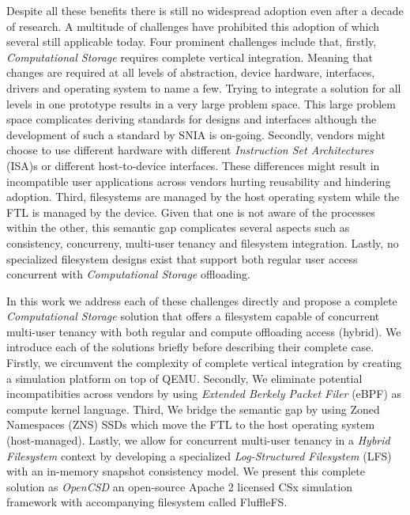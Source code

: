 \documentclass[conference]{IEEEtran}
\begin{document}

Despite all these benefits there is still no widespread adoption even after a
decade of research\cite{lukken2021past}. A multitude of challenges
have prohibited this adoption of which several still applicable today. Four
prominent challenges include that, firstly, \textit{Computational Storage}
requires complete vertical integration. Meaning that changes are required at all
levels of abstraction, device hardware, interfaces, drivers and operating system
to name a few. Trying to integrate a solution for all levels in one prototype
results in a very large problem space. This large problem space complicates
deriving standards for designs and interfaces although the development of such a
standard by SNIA is on-going\cite{snia-model}. Secondly, vendors might choose to
use different hardware with different
\textit{Instruction Set Architectures} (ISA)s or different host-to-device
interfaces. These differences might result in incompatible user applications
across vendors hurting reusability and hindering adoption. Third, filesystems
are managed by the host operating system while the FTL is
managed by the device. Given that one is not aware of the processes within the
other, this semantic gap complicates several aspects such as consistency,
concurreny, multi-user tenancy and filesystem integration. Lastly, no
specialized filesystem designs exist that support both regular user access
concurrent with \textit{Computational Storage} offloading.


In this work we address each of these challenges directly and propose a
complete \textit{Computational Storage} solution that offers a filesystem
capable of concurrent multi-user tenancy with both regular and compute
offloading access (hybrid). We introduce each of the solutions briefly before
describing their complete case. Firstly, we circumvent the complexity of
complete vertical integration by creating a simulation platform on top of
QEMU\cite{qemu}. Secondly, We eliminate potential incompatibities across vendors
by using \textit{Extended Berkely Packet Filer} (eBPF)\cite{what-ebpf} as
compute kernel language. Third, We bridge the semantic gap by using Zoned
Namespaces (ZNS)\cite{zns} SSDs which move the FTL to the host operating
system (host-managed). Lastly, we allow for concurrent multi-user tenancy in
a \textit{Hybrid Filesystem} context by developing a specialized
\textit{Log-Structured Filesystem} (LFS)\cite{Rosenblum1992TheDA} with an
in-memory snapshot consistency model\cite{Viotti2016ConsistencyIN}. We present
this complete solution as \textit{OpenCSD} an open-source Apache 2 licensed CSx
simulation framework with accompanying filesystem called
FluffleFS\cite{qemu-csd}.
\end{document}
